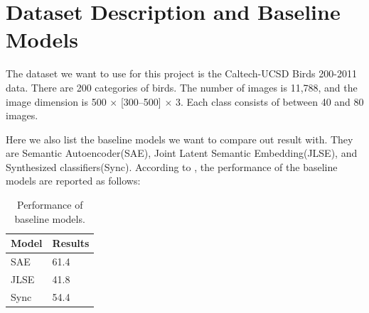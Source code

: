 \documentclass{article}
\newcommand{\bb}[1]{\boldsymbol{#1}}
\begin{document}





\section{Dataset Description and Baseline Models}

The dataset we want to use for this project is the Caltech-UCSD Birds 200-2011 data\cite{wah2011caltech}. There are 200 categories of birds. The number of images is 11,788, and the image dimension is 500 $\times$ [300--500] $\times$ 3. Each class consists of between 40 and 80 images. 

Here we also list the baseline models we want to compare out result with. They are Semantic Autoencoder(SAE)\cite{kodirov2017semantic}, Joint Latent Semantic Embedding(JLSE)\cite{zhang2016zero}, and Synthesized classifiers(Sync)\cite{changpinyo2016synthesized}. According to \cite{kodirov2017semantic}, the performance of the baseline models are reported as follows:
\begin{table}[!htb]
 \centering
 \begin{tabular}{|l|l|}
  \hline
  Model & Results \\
  \hline
  SAE\cite{kodirov2017semantic} & 61.4 \\
  \hline
  JLSE\cite{zhang2016zero} & 41.8 \\
  \hline
  Sync\cite{changpinyo2016synthesized} & 54.4 \\
  \bottomrule
 \end{tabular}
 \caption{Performance of baseline models.}
\end{table}








	
\end{document}
